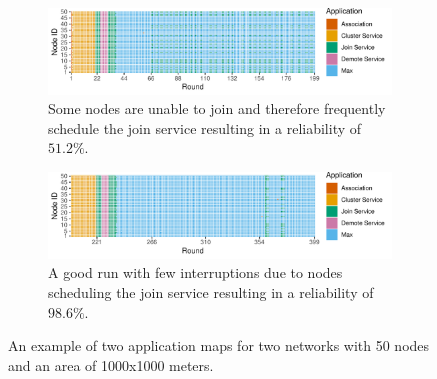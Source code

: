 \begin{figure}[bt]
    \centering
        \begin{subfigure}{\textwidth}
        \centering
        \includegraphics[width=\textwidth, keepaspectratio]{figure/Results/Discussion/applicationmap-50nodes-1000x1000-max-off-run1-bad.pdf}
        \caption{Some nodes are unable to join and therefore frequently schedule the join service resulting in a reliability of $51.2\%$.}
        \label{subfig:application-map-bad-clustering}
    \end{subfigure}
    \hfill
    \begin{subfigure}{\textwidth}
        \centering
        \includegraphics[width=\textwidth, keepaspectratio]{figure/Results/Discussion/applicationmap-50nodes-1000x1000-max-off-run5-good.pdf}
        \caption{A good run with few interruptions due to nodes scheduling the join service resulting in a reliability of $98.6\%$.}
        \label{subfig:application-map-good-clustering}
    \end{subfigure}
    \caption{An example of two application maps for two networks with 50 nodes and an area of 1000x1000 meters.}
    \label{fig:application-map-comparing-good-and-bad-clustering}
\end{figure}